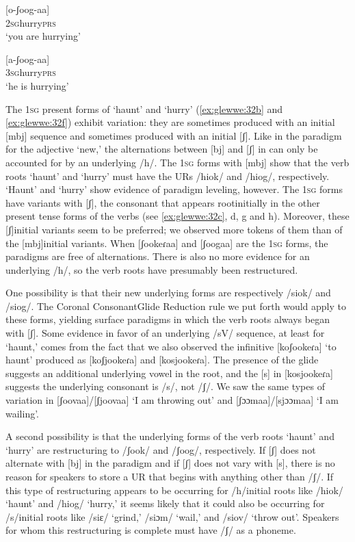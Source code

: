 \documentclass[output=paper]{langsci/langscibook}
\begin{document}
\ea{}
 [o-ʃoog-aa]\\{}
\textsc{2sg}hurry\textsc{prs}\\{}
\glt ‘you are hurrying’
\z


\ea{}
 [a-ʃoog-aa]\\{}
\textsc{3sg}hurry\textsc{prs}\\{}
\glt ‘he is hurrying’
\z

The 1\textsc{sg} present forms of ‘haunt’ and ‘hurry’ (\ref{ex:glewwe:32b} and \ref{ex:glewwe:32f}) exhibit variation: they are sometimes produced with an initial [mbj] sequence and sometimes produced with an initial [ʃ]. Like in the paradigm for the adjective ‘new,’ the alternations between [bj] and [ʃ] in  can only be accounted for by an underlying /h/. The 1\textsc{sg} forms with [mbj] show that the verb roots ‘haunt’ and ‘hurry’ must have the URs /hiok/ and /hiog/, respectively. ‘Haunt’ and ‘hurry’ show evidence of paradigm leveling, however. The 1\textsc{sg} forms have variants with [ʃ], the consonant that appears rootinitially in the other present tense forms of the verbs (see \ref{ex:glewwe:32c}, d, g and h). Moreover, these [ʃ]initial variants seem to be preferred; we observed more tokens of them than of the [mbj]initial variants. When [ʃookeɾaa] and [ʃoogaa] are the 1\textsc{sg} forms, the paradigms are free of alternations. There is also no more evidence for an underlying /h/, so the verb roots have presumably been restructured. 

One possibility is that their new underlying forms are respectively /siok/ and /siog/. The Coronal ConsonantGlide Reduction rule we put forth would apply to these forms, yielding surface paradigms in which the verb roots always began with [ʃ]. Some evidence in favor of an underlying /sV/ sequence, at least for ‘haunt,’ comes from the fact that we also observed the infinitive [koʃookeɾa] ‘to haunt’ produced as [koʃjookeɾa] and [kosjookeɾa]. The presence of the glide suggests an additional underlying vowel in the root, and the [s] in [kosjookeɾa] suggests the underlying consonant is /s/, not /ʃ/. We saw the same types of variation in [ʃoovaa]/[ʃjoovaa] ‘I am throwing out’ and [ʃɔɔmaa]/[sjɔɔmaa] ‘I am wailing’. 

A second possibility is that the underlying forms of the verb roots ‘haunt’ and ‘hurry’ are restructuring to /ʃook/ and /ʃoog/, respectively. If [ʃ] does not alternate with [bj] in the paradigm and if [ʃ] does not vary with [s], there is no reason for speakers to store a UR that begins with anything other than /ʃ/. If this type of restructuring appears to be occurring for /h/initial roots like /hiok/ ‘haunt’ and /hiog/ ‘hurry,’ it seems likely that it could also be occurring for /s/initial roots like /siɛ/ ‘grind,’ /siɔm/ ‘wail,’ and /siov/ ‘throw out’. Speakers for whom this restructuring is complete must have /ʃ/ as a phoneme. 
\end{document}
